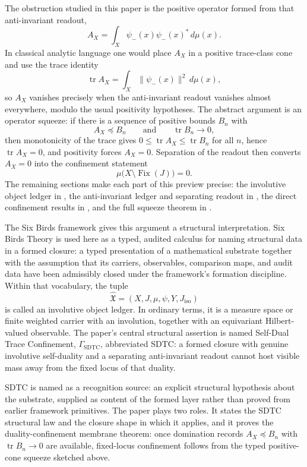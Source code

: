 \documentclass[11pt]{article}
\DeclareMathOperator{\Fix}{Fix}
\DeclareMathOperator{\trace}{tr}
\newcommand{\psim}{\psi_{-}}
\newcommand{\AX}{A_{X}}
\newcommand{\Jiso}{J_{\mathrm{iso}}}
\newcommand{\IOL}{\hat{\mathfrak{X}}}
\newcommand{\GamSDTC}{\Gamma_{\mathrm{SDTC}}}
\theoremstyle{definition}
\begin{document}
The obstruction studied in this paper is the positive operator
formed from that anti-invariant readout,
\[
  \AX = \int_X \psim(x)\psim(x)^*\,d\mu(x).
\]
In classical analytic language one would place \(\AX\) in a positive
trace-class cone and use the trace identity
\[
  \trace \AX = \int_X \|\psim(x)\|^2\,d\mu(x),
\]
so \(\AX\) vanishes precisely when the anti-invariant readout
vanishes almost everywhere, modulo the usual positivity hypotheses.
The abstract argument is an operator squeeze: if there is a sequence
of positive bounds \(B_n\) with
\[
  \AX \preceq B_n
  \qquad\text{and}\qquad
  \trace B_n \to 0,
\]
then monotonicity of the trace gives \(0 \leq \trace \AX \leq
\trace B_n\) for all \(n\), hence \(\trace \AX=0\), and positivity
forces \(\AX=0\).  Separation of the readout then converts
\(\AX=0\) into the confinement statement
\[
  \mu\bigl(X\setminus \Fix(J)\bigr)=0.
\]
The remaining sections make each part of this preview precise:
the involutive object ledger in , the
anti-invariant ledger and separating readout in
, the direct confinement results in
, and the full squeeze theorem in
.

The Six Birds framework gives this argument a structural
interpretation.  Six Birds Theory is used here as a typed, audited
calculus for naming structural data in a formed closure: a typed
presentation of a mathematical substrate together with the assumption
that its carriers, observables, comparison maps, and audit data have
been admissibly closed under the framework's formation discipline.
Within that vocabulary, the tuple
\[
  \IOL=(X,J,\mu,\psi,Y,\Jiso)
\]
is called an involutive object ledger.  In ordinary terms, it is a
measure space or finite weighted carrier with an involution, together
with an equivariant Hilbert-valued observable.  The paper's central
structural assertion is named Self-Dual Trace Confinement,
\(\GamSDTC\), abbreviated SDTC: a formed closure with genuine
involutive self-duality and a
separating anti-invariant readout cannot host visible mass away from
the fixed locus of that duality.

SDTC is named as a recognition source: an explicit structural
hypothesis about the substrate, supplied as content of the formed
layer rather than proved from earlier framework primitives.  The
paper plays two roles.  It states the SDTC structural law and the
closure shape in which it applies, and it proves the
duality-confinement membrane theorem: once domination records
\(\AX \preceq B_n\) with \(\trace B_n\to0\) are available,
fixed-locus confinement follows from the typed positive-cone
squeeze sketched above.
\end{document}
